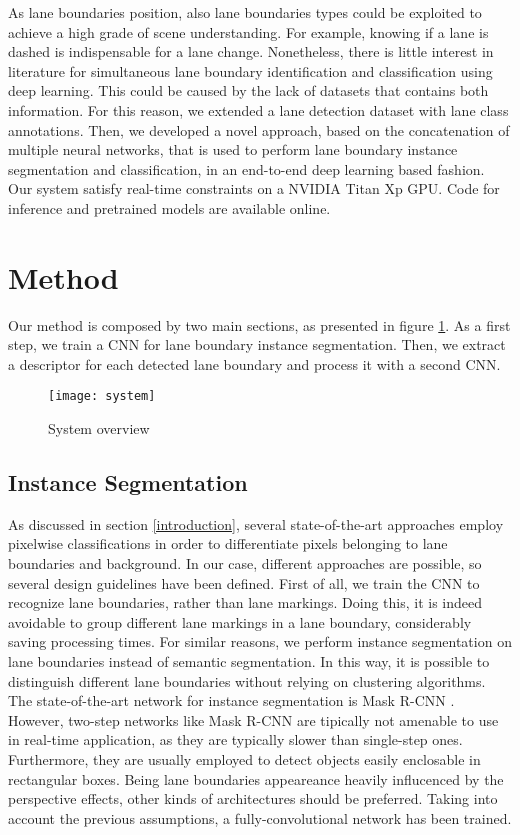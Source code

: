 \documentclass[runningheads]{llncs}
\begin{document}
As lane boundaries position, also lane boundaries types could be exploited to achieve a high grade of scene understanding. For example, knowing if a lane is dashed is indispensable for a lane change. Nonetheless, there is little interest in literature for simultaneous lane boundary identification and classification using deep learning. This could be caused by the lack of datasets that contains both information. For this reason, we extended a lane detection dataset with lane class annotations. Then, we developed a novel approach, based on the concatenation of multiple neural networks, that is used to perform lane boundary instance segmentation and classification, in an end-to-end deep learning based fashion. Our system satisfy real-time constraints on a NVIDIA Titan Xp GPU. Code for inference and pretrained models are available online.

\section{Method}
Our method is composed by two main sections, as presented in figure \ref{figure:system}. As a first step, we train a CNN for lane boundary instance segmentation. Then, we extract a descriptor for each detected lane boundary and process it with a second CNN.
\begin{figure}[h]
\hfill
\centering
\texttt{[image: system]}
\hfill
\caption{System overview}\label{figure:system}
\end{figure}
\subsection{Instance Segmentation}

As discussed in section \ref{introduction}, several state-of-the-art approaches employ pixelwise classifications in order to differentiate pixels belonging to lane boundaries and background. In our case, different approaches are possible, so several design guidelines have been defined. First of all, we train the CNN to recognize lane boundaries, rather than lane markings. Doing this, it is indeed avoidable to group different lane markings in a lane boundary, considerably saving processing times. For similar reasons, we perform instance segmentation on lane boundaries instead of semantic segmentation. In this way, it is possible to distinguish different lane boundaries without relying on clustering algorithms. The state-of-the-art network for instance segmentation is Mask R-CNN \cite{he2017mask}. However, two-step networks like Mask R-CNN are tipically not amenable to use in real-time application, as they are typically slower than single-step ones. Furthermore, they are usually employed to detect objects easily enclosable in rectangular boxes. Being lane boundaries appeareance heavily influcenced by the perspective effects, other kinds of architectures should be preferred. Taking into account the previous assumptions, a fully-convolutional network has been trained.
\end{document}
